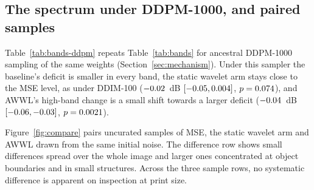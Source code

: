 
\subsection{The spectrum under DDPM-1000, and paired samples}
\label{app:supp-mechanism}

Table~\ref{tab:bands-ddpm} repeats Table~\ref{tab:bands} for ancestral
DDPM-1000 sampling of the same weights (Section~\ref{sec:mechanism}). Under
this sampler the baseline's deficit is smaller in every band, the static
wavelet arm stays close to the MSE level, as under DDIM-100 ($-0.02$~dB
$[-0.05, 0.004]$,
$p = 0.074$), and AWWL's high-band change is a small shift
towards a larger deficit ($-0.04$~dB
$[-0.06, -0.03]$, $p = 0.0021$).


Figure~\ref{fig:compare} pairs uncurated samples of MSE, the static wavelet
arm and AWWL drawn from the same initial noise. The difference row shows small
differences spread over the whole image and larger ones concentrated at object
boundaries and in small structures. Across the three sample rows, no
systematic difference is apparent on inspection at print size.

